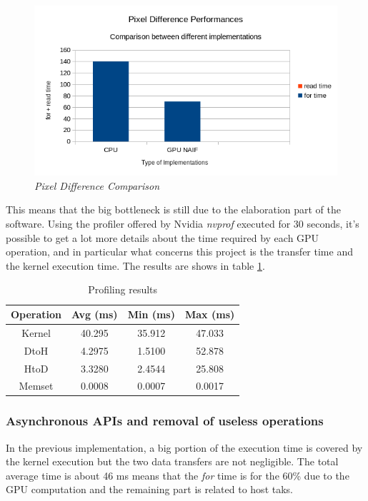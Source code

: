 \documentclass[paper=a4, fontsize=10pt]{scrartcl}	%
\begin{document}
	\begin{figure}[H]
		\centering
		\includegraphics[width=0.8\linewidth]{images/chart2.png}
		\caption{\textit{Pixel Difference Comparison}}
		\label{fig:chart2}
	\end{figure}

	This means that the big bottleneck is still due to the elaboration part of the software. Using the profiler offered by Nvidia \textit{nvprof} executed for 30 seconds, it's possible to get a lot more details about the time required by each GPU operation, and in particular what concerns this project is the transfer time and the kernel execution time. The results are shows in table \ref{tab:nvprof_naif}.

	\begin{table}[H]
		\centering
		\begin{tabular}{||c | c c c||} 
			\hline
			Operation & Avg (ms) & Min (ms) & Max (ms) \\ [0.5ex] 
			\hline\hline
			Kernel & 40.295 & 35.912 & 47.033 \\ 
			\hdashline
			DtoH & 4.2975 & 1.5100 & 52.878 \\
			\hdashline
			HtoD & 3.3280 & 2.4544 & 25.808 \\
			\hdashline
			Memset & 0.0008 & 0.0007 & 0.0017 \\
			\hline
		\end{tabular}
		\caption{Profiling results}
		\label{tab:nvprof_naif}
	\end{table}

	\subsubsection{Asynchronous APIs and removal of useless operations}

	In the previous implementation, a big portion of the execution time is covered by the kernel execution but the two data transfers are not negligible. The total average time is about 46 ms means that the \textit{for} time is for the 60\% due to the GPU computation and the remaining part is related to host taks.\\
\end{document}
